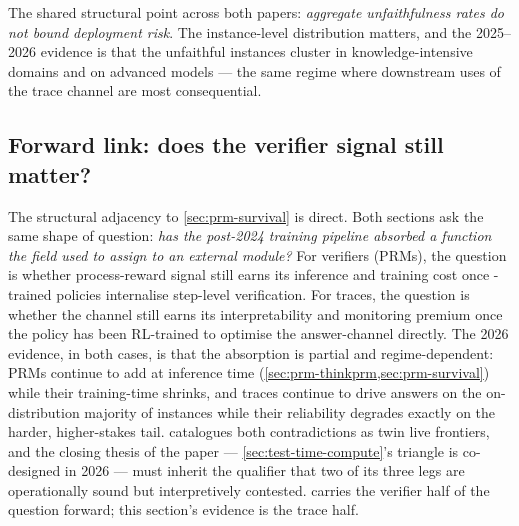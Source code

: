 The shared structural point across both papers: \emph{aggregate
unfaithfulness rates do not bound deployment risk}. The instance-level
distribution matters, and the 2025--2026 evidence is that the unfaithful
instances cluster in knowledge-intensive domains and on advanced models
\citep[abstract]{shen2025-faithcot-bench} — the same regime where
downstream uses of the trace channel are most consequential.

\subsection{Forward link: does the verifier signal still matter?}
\label{sec:faith-forward}

The structural adjacency to \cref{sec:prm-survival} is direct. Both
sections ask the same shape of question: \emph{has the post-2024
training pipeline absorbed a function the field used to assign to an
external module?} For verifiers (PRMs), the question is whether
process-reward signal still earns its inference and training cost once
-trained policies internalise step-level verification. For traces,
the question is whether the  channel still earns its interpretability
and monitoring premium once the policy has been RL-trained to optimise
the answer-channel directly. The 2026 evidence, in both cases, is that
the absorption is partial and regime-dependent: PRMs continue to add
 at inference time (\cref{sec:prm-thinkprm,sec:prm-survival}) while
their training-time  shrinks, and traces continue to drive answers
on the on-distribution majority of instances while their reliability
degrades exactly on the harder, higher-stakes tail.
 catalogues both contradictions as twin live
frontiers, and the closing thesis of the paper —
\cref{sec:test-time-compute}'s triangle is co-designed in 2026 — must
inherit the qualifier that two of its three legs are operationally
sound but interpretively contested.  carries the
verifier half of the question forward; this section's evidence is the
trace half.
